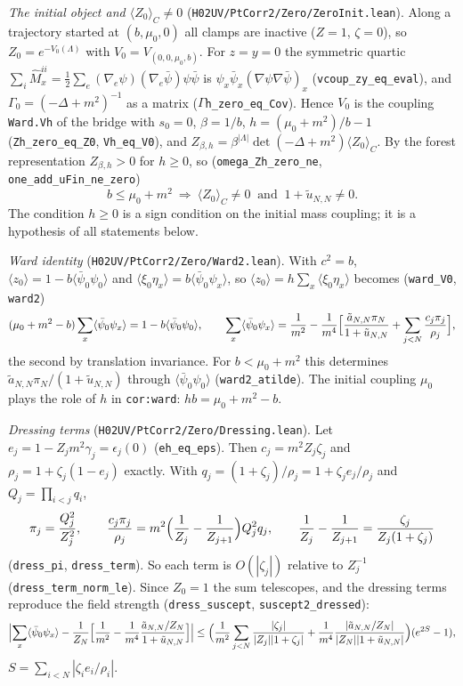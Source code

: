 \documentclass[11pt]{amsart}
\theoremstyle{definition}
\theoremstyle{remark}
\numberwithin{equation}{section}
\newcommand{\avg}[1]{\langle #1\rangle}
\begin{document}
\emph{The initial object and $\avg{Z_0}_C\ne0$} (\texttt{H02UV/PtCorr2/Zero/ZeroInit.lean}). Along a trajectory started at $(b,\mu_0,0)$ all clamps are
inactive ($Z=1$, $\zeta=0$), so $Z_0=e^{-V_0(\Lambda)}$ with $V_0=V_{(0,0,\mu_0,b)}$. For $z=y=0$ the symmetric quartic
$\sum_i\hat M^{ii}_x=\frac12\sum_e(\nabla_e\psi)(\nabla_e\bar\psi)\psi\bar\psi$ is $\psi_x\bar\psi_x(\nabla\psi\nabla\bar\psi)_x$
(\texttt{vcoup\_zy\_eq\_eval}), and $\Gamma_0=(-\Delta+m^2)^{-1}$ as a matrix (\texttt{$\Gamma$h\_zero\_eq\_Cov}). Hence $V_0$ is the coupling \texttt{Ward.Vh} of the bridge with $s_0=0$, $\beta=1/b$, $h=(\mu_0+m^2)/b-1$ (\texttt{Zh\_zero\_eq\_Z0},
\texttt{Vh\_eq\_V0}), and $Z_{\beta,h}=\beta^{|\Lambda|}\det(-\Delta+m^2)\avg{Z_0}_C$. By the forest representation $Z_{\beta,h}>0$ for $h\ge0$,
so (\texttt{omega\_Zh\_zero\_ne}, \texttt{one\_add\_uFin\_ne\_zero})
\[
  b\le\mu_0+m^2\ \Longrightarrow\ \avg{Z_0}_C\ne0\ \text{ and }\ 1+\tilde u_{N,N}\ne0.
\]
The condition $h\ge0$ is a sign condition on the initial mass coupling; it is a hypothesis of all statements below.

\emph{Ward identity} (\texttt{H02UV/PtCorr2/Zero/Ward2.lean}). With $c^2=b$, $\avg{z_0}=1-b\avg{\bar\psi_0\psi_0}$ and
$\avg{\xi_0\eta_x}=b\avg{\bar\psi_0\psi_x}$, so $\avg{z_0}=h\sum_x\avg{\xi_0\eta_x}$ becomes (\texttt{ward\_V0}, \texttt{ward2})
\[
  (\mu_0+m^2-b)\sum_x\avg{\bar\psi_0\psi_x}=1-b\avg{\bar\psi_0\psi_0},\qquad
  \sum_x\avg{\bar\psi_0\psi_x}=\frac1{m^2}-\frac1{m^4}\Bigl[\frac{\tilde a_{N,N}\pi_N}{1+\tilde u_{N,N}}+\sum_{j<N}\frac{c_j\pi_j}{\rho_j}\Bigr],
\]
the second by translation invariance. For $b<\mu_0+m^2$ this determines $\tilde a_{N,N}\pi_N/(1+\tilde u_{N,N})$ through
$\avg{\bar\psi_0\psi_0}$ (\texttt{ward2\_atilde}). The initial coupling $\mu_0$ plays the role of $h$ in \texttt{cor:ward}: $hb=\mu_0+m^2-b$.

\emph{Dressing terms} (\texttt{H02UV/PtCorr2/Zero/Dressing.lean}). Let $e_j=1-Z_jm^2\gamma_j=\epsilon_j(0)$ (\texttt{eh\_eq\_eps}). Then $c_j=m^2Z_j\zeta_j$ and
$\rho_j=1+\zeta_j(1-e_j)$ exactly. With $q_j=(1+\zeta_j)/\rho_j=1+\zeta_je_j/\rho_j$ and $Q_j=\prod_{i<j}q_i$,
\[
  \pi_j=\frac{Q_j^2}{Z_j^2},\qquad \frac{c_j\pi_j}{\rho_j}=m^2\Bigl(\frac1{Z_j}-\frac1{Z_{j+1}}\Bigr)Q_j^2q_j,\qquad
  \frac1{Z_j}-\frac1{Z_{j+1}}=\frac{\zeta_j}{Z_j(1+\zeta_j)}
\]
(\texttt{dress\_pi}, \texttt{dress\_term}). So each term is $O(|\zeta_j|)$ relative to $Z_j^{-1}$
(\texttt{dress\_term\_norm\_le}). Since $Z_0=1$ the sum telescopes, and the dressing terms reproduce the field strength
(\texttt{dress\_suscept}, \texttt{suscept2\_dressed}):
\[
  \Bigl|\sum_x\avg{\bar\psi_0\psi_x}-\frac1{Z_N}\Bigl[\frac1{m^2}-\frac1{m^4}\frac{\tilde a_{N,N}/Z_N}{1+\tilde u_{N,N}}\Bigr]\Bigr|
  \le\Bigl(\frac1{m^2}\sum_{j<N}\frac{|\zeta_j|}{|Z_j||1+\zeta_j|}+\frac1{m^4}\frac{|\tilde a_{N,N}/Z_N|}{|Z_N||1+\tilde u_{N,N}|}\Bigr)(e^{2S}-1),
\]
$S=\sum_{i<N}|\zeta_ie_i/\rho_i|$.
\end{document}
